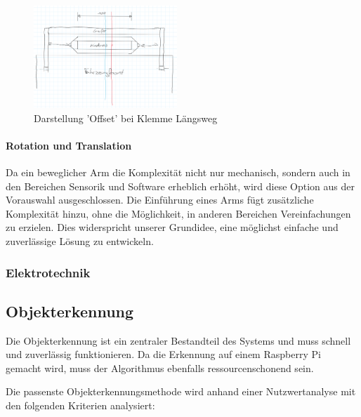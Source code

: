         \begin{figure}[h!]
            \centering
            \includegraphics[width=0.48\textwidth]{img/konzeptfindung/Klemme_Langsweg_off_center.png}
            \caption{Darstellung 'Offset' bei Klemme Längsweg}
        \label{img:konzept_zentrierung_3}
        \end{figure}  
                        
        \newpage         
        \paragraph{Rotation und Translation}
        Da ein beweglicher Arm die Komplexität nicht nur mechanisch, sondern auch in den Bereichen Sensorik und Software erheblich erhöht, wird diese Option aus der Vorauswahl ausgeschlossen. Die Einführung eines Arms fügt zusätzliche Komplexität hinzu, ohne die Möglichkeit, in anderen Bereichen Vereinfachungen zu erzielen. Dies widerspricht unserer Grundidee, eine möglichst einfache und zuverlässige Lösung zu entwickeln.

\subsubsection{Elektrotechnik}
    \paragraph{}

\subsection{Objekterkennung}

Die Objekterkennung ist ein zentraler Bestandteil des Systems und muss schnell und zuverlässig funktionieren. Da die Erkennung auf einem Raspberry Pi gemacht wird, muss der Algorithmus ebenfalls ressourcenschonend sein.

Die passenste Objekterkennungsmethode wird anhand einer Nutzwertanalyse mit den folgenden Kriterien analysiert:
\begin{list}
\end{list}

